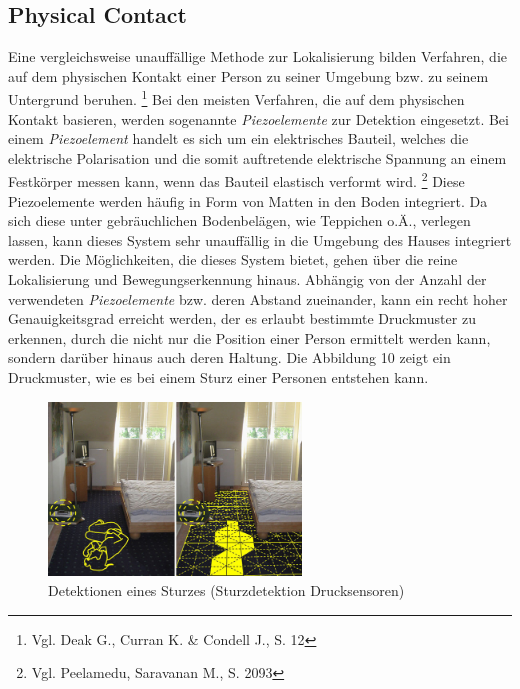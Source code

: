 \subsection{Physical Contact}
Eine vergleichsweise unauffällige Methode zur Lokalisierung bilden Verfahren, die auf dem physischen Kontakt einer Person zu seiner Umgebung bzw. zu seinem Untergrund beruhen. \footnote{Vgl. Deak G., Curran K. \& Condell J., S. 12} Bei den meisten Verfahren, die auf dem physischen Kontakt basieren, werden sogenannte \textit{Piezoelemente} zur Detektion eingesetzt. Bei einem \textit{Piezoelement} handelt es sich um ein elektrisches Bauteil, welches die elektrische Polarisation und die somit auftretende elektrische Spannung an einem Festkörper messen kann, wenn das Bauteil elastisch verformt wird. \footnote{Vgl. Peelamedu, Saravanan M., S. 2093} \newline\newline
Diese Piezoelemente werden häufig in Form von Matten in den Boden integriert. Da sich diese unter gebräuchlichen Bodenbelägen, wie Teppichen o.Ä., verlegen lassen, kann dieses System sehr unauffällig in die Umgebung des Hauses integriert werden. Die Möglichkeiten, die dieses System bietet, gehen über die reine Lokalisierung und Bewegungserkennung hinaus.
Abhängig von der Anzahl der verwendeten \textit{Piezoelemente} bzw. deren Abstand zueinander, kann ein recht hoher Genauigkeitsgrad erreicht werden, der es erlaubt bestimmte Druckmuster zu erkennen, durch die nicht nur die Position einer Person ermittelt werden kann, sondern darüber hinaus auch deren Haltung. Die Abbildung 10 zeigt ein Druckmuster, wie es bei einem Sturz einer Personen entstehen kann.\\

\begin{figure}[H]
	\centering
	\includegraphics[width=0.6\textwidth]{pictures/piezo}
	\caption{Detektionen eines Sturzes (Sturzdetektion Drucksensoren)}
\end{figure} 

